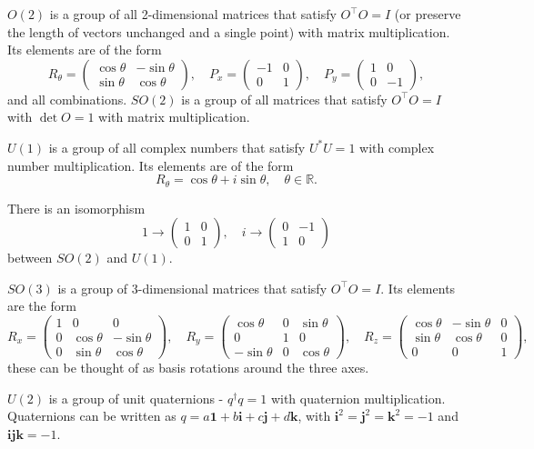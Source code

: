 \documentclass{article}
\begin{document}
\example $O(2)$ is a group of all 2-dimensional matrices that satisfy $O^\intercal O=I$ (or preserve the length of vectors unchanged and a single point) with matrix multiplication. Its elements are of the form 
$$R_\theta=\begin{pmatrix}\cos\theta&-\sin\theta\\\sin\theta&\cos\theta\end{pmatrix},\quad P_x=\begin{pmatrix}-1&0\\0&1\end{pmatrix},\quad P_y=\begin{pmatrix}1&0\\0&-1\end{pmatrix},$$
and all combinations. 
\example $SO(2)$ is a group of all matrices that satisfy $O^\intercal O=I$ with $\det O=1$ with matrix multiplication.

\example $U(1)$ is a group of all complex numbers that satisfy $U^*U=1$ with complex number multiplication. Its elements are of the form 
$$R_\theta=\cos\theta+i\sin\theta,\quad \theta\in\mathbb R.$$

There is an isomorphism 
$$1\to\begin{pmatrix}1&0\\0&1\end{pmatrix},\quad i\to\begin{pmatrix}0&-1\\1&0\end{pmatrix}$$
between $SO(2)$ and $U(1)$. 

\example $SO(3)$ is a group of 3-dimensional matrices that satisfy $O^\intercal O=I$. Its elements are the form 
$$R_x=\begin{pmatrix}1&0&0\\0&\cos\theta&-\sin\theta\\0&\sin\theta&\cos\theta\end{pmatrix},\quad R_y=\begin{pmatrix}\cos\theta&0&\sin\theta\\0&1&0\\-\sin\theta&0&\cos\theta\end{pmatrix},\quad R_z=\begin{pmatrix}\cos\theta&-\sin\theta&0\\\sin\theta&\cos\theta&0\\0&0&1\end{pmatrix},$$
these can be thought of as basis rotations around the three axes.

\example $U(2)$ is a group of unit quaternions - $q^\dag q=1$ with quaternion multiplication. Quaternions can be written as $q=a\mathbf 1+b\mathbf i+c\mathbf j+d\mathbf k$, with $\mathbf i^2=\mathbf j^2=\mathbf k^2=-1$ and $\mathbf{ijk}=-1$. 
\end{document}
